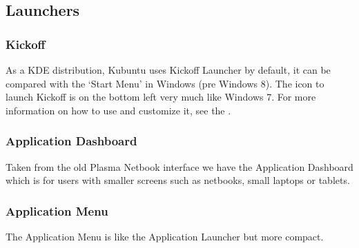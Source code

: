 \documentclass[letterpaper,10pt,english]{sphinxmanual}
\begin{document}
\subsection{Launchers}
\label{\detokenize{docs/desktop-guide/basic:launchers}}

\subsubsection{Kickoff}
\label{\detokenize{docs/desktop-guide/basic:kickoff}}

\sphinxAtStartPar
As a KDE distribution, Kubuntu uses Kickoff Launcher by default, it can be compared with the ‘Start Menu’ in Windows (pre Windows 8). The icon to launch Kickoff is on the bottom left very much like Windows 7. For more information on how to use and customize it, see the .


\subsubsection{Application Dashboard}
\label{\detokenize{docs/desktop-guide/basic:application-dashboard}}

\sphinxAtStartPar
Taken from the old Plasma Netbook interface we have the Application Dashboard which is for users with smaller screens such as netbooks, small laptops or tablets.


\subsubsection{Application Menu}
\label{\detokenize{docs/desktop-guide/basic:application-menu}}

\sphinxAtStartPar
The Application Menu is like the Application Launcher but more compact.
\end{document}

